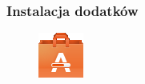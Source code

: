 \subsubsection{Instalacja dodatków}
\label{ubuntu-restricted-extras}
\begin{figure}
	\vspace{-10pt}
	\includegraphics[width=\linewidth]{images/pierwsze_uruchomienie_dodatki1.png}
\end{figure}

